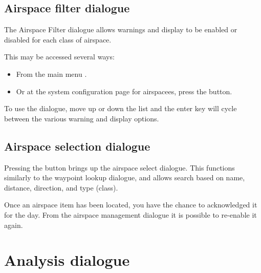 

\subsection*{Airspace filter dialogue}\label{sec:airspace-filter}

The Airspace Filter dialogue allows warnings and display to be enabled
or disabled for each class of airspace.  

This may be accessed several ways:
\begin{itemize}
\item From the main menu \blink{}.
\item Or at the system configuration page for airspacees, press the  button.
\end{itemize}

To use the dialogue, move up or down the list and the enter key will
cycle between the various warning and display options.

\subsection*{Airspace selection dialogue}

Pressing the  button brings up the airspace select dialogue.
This functions similarly to the waypoint lookup dialogue, and allows
search based on name, distance, direction, and type (class).  

Once an airspace item has been located, you have the chance to acknowledged it 
for the day.  From the
airspace management dialogue it is possible to re-enable it again.

\section{Analysis dialogue}

